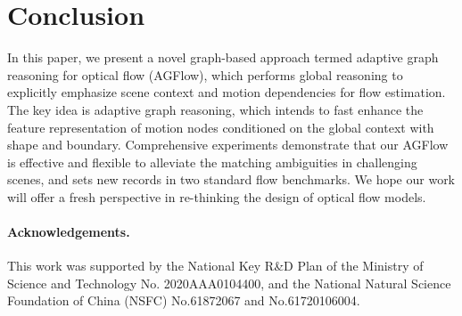 \documentclass[letterpaper]{article} %
\begin{document}
\section{Conclusion}

In this paper, we present a novel graph-based approach termed adaptive graph reasoning for optical flow (AGFlow), which performs global reasoning to explicitly emphasize scene context and motion dependencies for flow estimation. The key idea is adaptive graph reasoning, which intends to fast enhance the feature representation of motion nodes conditioned on the global context with shape and boundary. Comprehensive experiments demonstrate that our AGFlow is effective and flexible to alleviate the matching ambiguities in challenging scenes, and sets new records in two standard flow benchmarks. We hope our work will offer a fresh perspective in re-thinking the design of optical flow models.

\paragraph{Acknowledgements.}
This work was supported by the National Key R\&D Plan of the Ministry of Science and Technology No. 2020AAA0104400, and the National Natural Science Foundation of China (NSFC) No.61872067 and No.61720106004.


\end{document}
